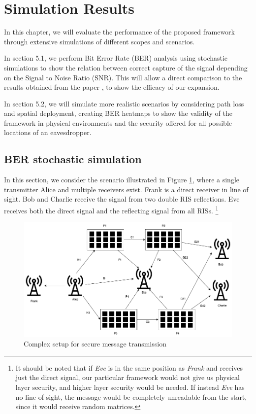 \section{Simulation Results}

In this chapter, we will evaluate the performance of the proposed framework through extensive simulations of different scopes and scenarios.

In section 5.1, we perform Bit Error Rate (BER) analysis using stochastic simulations to show the relation between correct capture of the signal depending on the Signal to Noise Ratio (SNR). This will allow a direct comparison to the results obtained from the paper \cite{9328149}, to show the efficacy of our expansion.

In section 5.2, we will simulate more realistic scenarios by considering path loss and spatial deployment, creating BER heatmaps to show the validity of the framework in physical environments and the security offered for all possible locations of an eavesdropper.

\subsection{BER stochastic simulation}

In this section, we consider the scenario illustrated in Figure \ref{fig:correlation_sk2}, where a single transmitter Alice and multiple receivers exist. Frank is a direct receiver in line of sight. Bob and Charlie receive the signal from two double RIS reflections. Eve receives both the direct signal and the reflecting signal from all RISs. \footnote{It should be noted that if \textit{Eve} is in the same position as \textit{Frank} and receives just the direct signal, our particular framework would not give us physical layer security, and higher layer security would be needed. If instead \textit{Eve} has no line of sight, the message would be completely unreadable from the start, since it would receive random matrices.}

\begin{figure}[H]
  \centering
  \includegraphics[width=\linewidth]{imgs/complex-situation.png}
  \caption{Complex setup for secure message transmission}
  \label{fig:correlation_sk2}
\end{figure}

